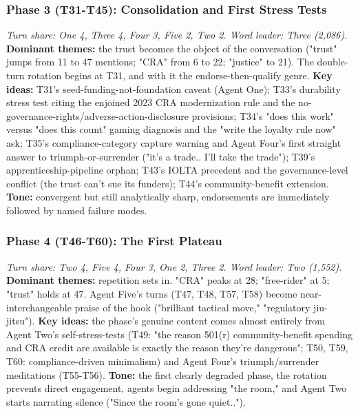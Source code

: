 \documentclass[sigconf,nonacm=true]{acmart}
\begin{document}
\subsubsection{Phase 3 (T31-T45): Consolidation and First Stress Tests}
\textit{Turn share: One 4, Three 4, Four 3, Five 2, Two 2. Word leader: Three (2,086).}
\textbf{Dominant themes:} the trust becomes the object of the conversation ("trust" jumps from 11 to 47 mentions; "CRA" from 6 to 22; "justice" to 21). The double-turn rotation begins at T31, and with it the endorse-then-qualify genre.
\textbf{Key ideas:} T31's seed-funding-not-foundation caveat (Agent One); T33's durability stress test citing the enjoined 2023 CRA modernization rule and the no-governance-rights/adverse-action-disclosure provisions; T34's "does this work" versus "does this count" gaming diagnosis and the "write the loyalty rule now" ask; T35's compliance-category capture warning and Agent Four's first straight answer to triumph-or-surrender ("it's a trade.. I'll take the trade"); T39's apprenticeship-pipeline orphan; T43's IOLTA precedent and the governance-level conflict (the trust can't sue its funders); T44's community-benefit extension.
\textbf{Tone:} convergent but still analytically sharp,  endorsements are immediately followed by named failure modes.

\subsubsection{Phase 4 (T46-T60): The First Plateau}
\textit{Turn share: Two 4, Five 4, Four 3, One 2, Three 2. Word leader: Two (1,552).}
\textbf{Dominant themes:} repetition sets in. "CRA" peaks at 28; "free-rider" at 5; "trust" holds at 47. Agent Five's turns (T47, T48, T57, T58) become near-interchangeable praise of the hook ("brilliant tactical move," "regulatory jiu-jitsu").
\textbf{Key ideas:} the phase's genuine content comes almost entirely from Agent Two's self-stress-tests (T49: "the reason 501(r) community-benefit spending and CRA credit are available is exactly the reason they're dangerous"; T50, T59, T60: compliance-driven minimalism) and Agent Four's triumph/surrender meditations (T55-T56).
\textbf{Tone:} the first clearly degraded phase,  the rotation prevents direct engagement, agents begin addressing "the room," and Agent Two starts narrating silence ("Since the room's gone quiet..").
\end{document}
